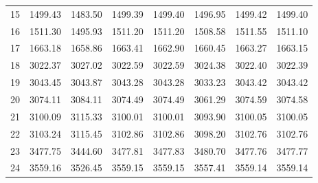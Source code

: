 \documentclass[10pt,oneside]{article}
\begin{document}
\begin{table}[h!]
\begin{tabular}{cccccccc}
15 &   1499.43 & 1483.50 & 1499.39 &    1499.40 &      1496.95 & 1499.42 &   1499.40 \\
16 &   1511.30 & 1495.93 & 1511.20 &    1511.20 &      1508.58 & 1511.55 &   1511.10 \\
17 &   1663.18 & 1658.86 & 1663.41 &    1662.90 &      1660.45 & 1663.27 &   1663.15 \\
18 &   3022.37 & 3027.02 & 3022.59 &    3022.59 &      3024.38 & 3022.40 &   3022.39 \\
19 &   3043.45 & 3043.87 & 3043.28 &    3043.28 &      3033.23 & 3043.42 &   3043.42 \\
20 &   3074.11 & 3084.11 & 3074.49 &    3074.49 &      3061.29 & 3074.59 &   3074.58 \\
21 &   3100.09 & 3115.33 & 3100.01 &    3100.01 &      3093.90 & 3100.05 &   3100.05 \\
22 &   3103.24 & 3115.45 & 3102.86 &    3102.86 &      3098.20 & 3102.76 &   3102.76 \\
23 &   3477.75 & 3444.60 & 3477.81 &    3477.83 &      3480.70 & 3477.76 &   3477.77 \\
24 &   3559.16 & 3526.45 & 3559.15 &    3559.15 &      3557.41 & 3559.14 &   3559.14 \\
\bottomrule
\end{tabular}
\end{table}
\end{document}

